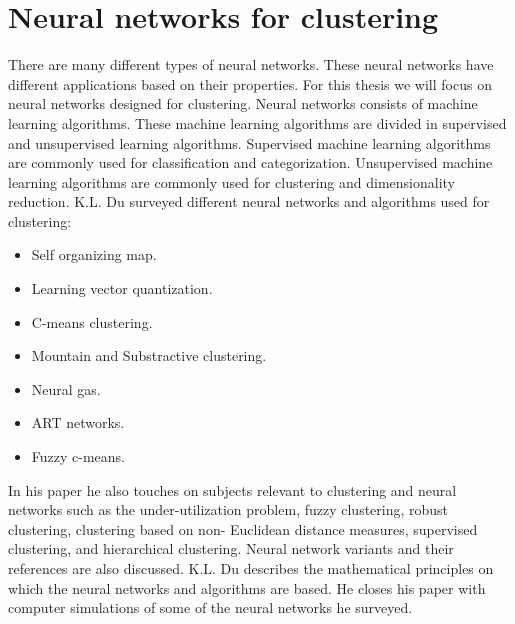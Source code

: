 \documentclass[../main]{subfiles}
\begin{document}
\section{Neural networks for clustering}
There are many different types of neural networks.
These neural networks have different applications based on their properties.
For this thesis we will focus on neural networks designed for clustering.
\newline
Neural networks consists of machine learning algorithms\cite{supervisedUnsupervised}. 
These machine learning algorithms are divided in supervised and unsupervised learning algorithms\cite{supervisedUnsupervised}.
Supervised machine learning algorithms are commonly used for classification and categorization\cite{supervisedUnsupervised}.
Unsupervised machine learning algorithms are commonly used for clustering and dimensionality reduction\cite{supervisedUnsupervised}.
\newline
K.L. Du surveyed different neural networks and algorithms used for clustering:
\begin{itemize}
    \item Self organizing map.
    \item Learning vector quantization.
    \item C-means clustering.
    \item Mountain and Substractive clustering.
    \item Neural gas.
    \item ART networks.
    \item Fuzzy c-means.
\end{itemize}
In his paper he also touches on subjects relevant to clustering and neural networks such as the under-utilization problem, fuzzy clustering, robust clustering, clustering based on non- Euclidean distance measures, supervised clustering, and hierarchical clustering.
Neural network variants and their references are also discussed.
\newline
K.L. Du describes the mathematical principles on which the neural networks and algorithms are based.
He closes his paper with computer simulations of some of the neural networks he surveyed.
\end{document}

